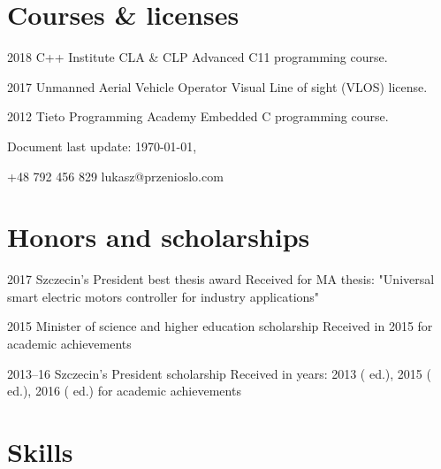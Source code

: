 \documentclass{tccv}
\begin{document}
\section{Courses \& licenses}

\begin{yearlist}

\item{2018}
     {C++ Institute CLA \& CLP}
     {Advanced C11 programming course.}

\item{2017}
     {Unmanned Aerial Vehicle Operator}
     {Visual Line of sight (VLOS) license.}

\item{2012}
     {Tieto Programming Academy}
     {Embedded C programming course.}

\end{yearlist}

\vspace*{\fill} %

{\scriptsize Document last update: \today, \currenttime}

    {+48 792 456 829}
    {lukasz@przenioslo.com}
    
\section{Honors and scholarships}

\begin{yearlist}

\item{2017}
     {Szczecin's President best thesis award}
     {Received for MA thesis: "Universal smart electric motors controller for industry applications"} 
     
\item{2015}
     {Minister of science and higher education scholarship}
     {Received in 2015 for academic achievements} 
     
\item{2013--16}
     {Szczecin's President scholarship}
     {Received in years: 2013 ( ed.), 2015 ( ed.), 2016 ( ed.) for academic achievements} 
    
\end{yearlist}

\section{Skills}
\end{document}
